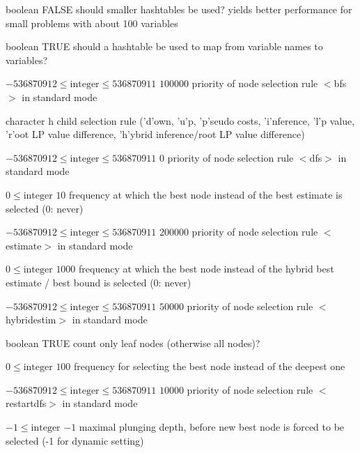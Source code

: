 %
{boolean}%
{FALSE}%
{should smaller hashtables be used? yields better performance for small problems with about 100 variables}%
{}

%
{boolean}%
{TRUE}%
{should a hashtable be used to map from variable names to variables?}%
{}

%
{$-536870912\leq\textrm{integer}\leq536870911$}%
{$100000$}%
{priority of node selection rule $<$bfs$>$ in standard mode}%
{}

%
{character}%
{h}%
{child selection rule ('d'own, 'u'p, 'p'seudo costs, 'i'nference, 'l'p value, 'r'oot LP value difference, 'h'ybrid inference/root LP value difference)}%
{}

%
{$-536870912\leq\textrm{integer}\leq536870911$}%
{$0$}%
{priority of node selection rule $<$dfs$>$ in standard mode}%
{}

%
{$0\leq\textrm{integer}$}%
{$10$}%
{frequency at which the best node instead of the best estimate is selected (0: never)}%
{}

%
{$-536870912\leq\textrm{integer}\leq536870911$}%
{$200000$}%
{priority of node selection rule $<$estimate$>$ in standard mode}%
{}

%
{$0\leq\textrm{integer}$}%
{$1000$}%
{frequency at which the best node instead of the hybrid best estimate / best bound is selected (0: never)}%
{}

%
{$-536870912\leq\textrm{integer}\leq536870911$}%
{$50000$}%
{priority of node selection rule $<$hybridestim$>$ in standard mode}%
{}

%
{boolean}%
{TRUE}%
{count only leaf nodes (otherwise all nodes)?}%
{}

%
{$0\leq\textrm{integer}$}%
{$100$}%
{frequency for selecting the best node instead of the deepest one}%
{}

%
{$-536870912\leq\textrm{integer}\leq536870911$}%
{$10000$}%
{priority of node selection rule $<$restartdfs$>$ in standard mode}%
{}

%
{$-1\leq\textrm{integer}$}%
{$-1$}%
{maximal plunging depth, before new best node is forced to be selected (-1 for dynamic setting)}%
{}

